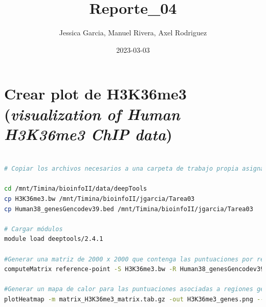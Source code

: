 \documentclass[
]{article}
\title{Reporte\_04}
\author{Jessica Garcia, Manuel Rivera, Axel Rodriguez}
\date{2023-03-03}
\begin{document}
\maketitle

{
\setcounter{tocdepth}{2}
\tableofcontents
}
\hypertarget{crear-plot-de-h3k36me3-visualization-of-human-h3k36me3-chip-data}{%
\section{\texorpdfstring{Crear plot de H3K36me3 (\emph{visualization of
Human H3K36me3 ChIP
data})}{Crear plot de H3K36me3 (visualization of Human H3K36me3 ChIP data)}}\label{crear-plot-de-h3k36me3-visualization-of-human-h3k36me3-chip-data}}

\begin{lstlisting}[language=bash]

# Copiar los archivos necesarios a una carpeta de trabajo propia asignada para esta tarea

cd /mnt/Timina/bioinfoII/data/deepTools
cp H3K36me3.bw /mnt/Timina/bioinfoII/jgarcia/Tarea03
cp Human38_genesGencodev39.bed /mnt/Timina/bioinfoII/jgarcia/Tarea03 

# Cargar módulos
module load deeptools/2.4.1

#Generar una matriz de 2000 x 2000 que contenga las puntuaciones por regiones del genoma y preparar un archivo intermedio para usarse con el comando plotHeatmap.
computeMatrix reference-point -S H3K36me3.bw -R Human38_genesGencodev39.bed --referencePoint center -a 2000 -b 2000 -out matrix_H3K36me3_matrix.tab.gz

#Generar un mapa de calor para las puntuaciones asociadas a regiones genómicas
plotHeatmap -m matrix_H3K36me3_matrix.tab.gz -out H3K36me3_genes.png --heatmapHeight 15 --refPointLabel gene.center --regionsLabel genes --plotTitle ' H3K36me3 signal'
\end{lstlisting}
\end{document}
